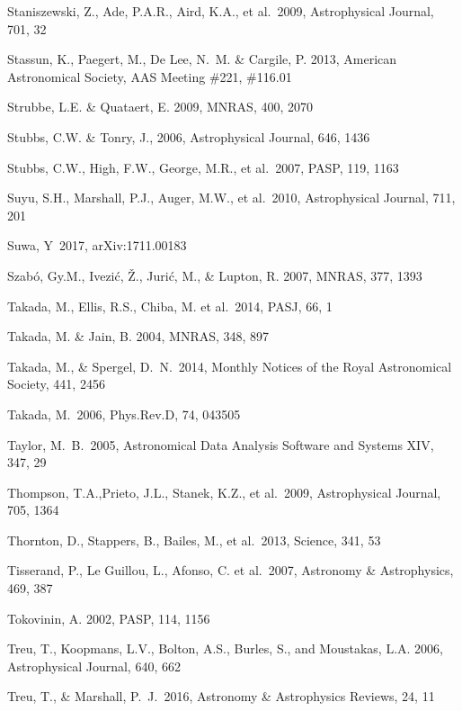 \documentclass[twocolumn]{aastex61}
\begin{document}
\begin{thebibliography}{}

\bibitem[()]{} Staniszewski, Z., Ade, P.A.R., Aird, K.A., et al.~2009,  Astrophysical  Journal, 701, 32

\bibitem[()]{} Stassun, K., Paegert, M., De Lee, N.~M. \& Cargile, P. 2013, American Astronomical Society,
                      AAS Meeting \#221, \#116.01

\bibitem[()]{} Strubbe, L.E. \& Quataert, E. 2009, MNRAS, 400, 2070

\bibitem[()]{} Stubbs, C.W. \& Tonry, J., 2006, Astrophysical Journal, 646, 1436

\bibitem[()]{} Stubbs, C.W., High, F.W., George, M.R., et al.~2007, PASP, 119, 1163

\bibitem[()]{} Suyu, S.H., Marshall, P.J., Auger, M.W., et al.~2010, Astrophysical Journal, 711, 201

\bibitem[()]{} Suwa, Y~2017, arXiv:1711.00183

\bibitem[()]{} Szab\'o, Gy.M., Ivezi\'c, \v{Z}., Juri\'c, M., \& Lupton, R. 2007, MNRAS, 377, 1393

\bibitem[()]{} Takada, M., Ellis, R.S., Chiba, M. et al.~2014, PASJ,
  66, 1

\bibitem[()]{} Takada, M. \& Jain, B. 2004, MNRAS, 348, 897

\bibitem[()]{} Takada, M., \& Spergel, D.~N.~2014, Monthly Notices of the Royal Astronomical Society, 441, 2456

\bibitem[()]{} Takada, M.\ 2006, Phys.Rev.D, 74, 043505

 Taylor, M.~B.\ 2005, Astronomical Data Analysis Software and Systems XIV, 347, 29

\bibitem[()]{} Thompson, T.A.,Prieto, J.L., Stanek, K.Z., et al.~2009, Astrophysical Journal, 705, 1364

\bibitem[()]{} Thornton, D., Stappers, B., Bailes, M., et al.~2013, Science, 341, 53

\bibitem[()]{} Tisserand, P., Le Guillou, L., Afonso, C. et al.~2007, Astronomy \& Astrophysics, 469, 387

\bibitem[()]{} Tokovinin, A. 2002, PASP, 114, 1156

\bibitem[()]{} Treu, T., Koopmans, L.V., Bolton, A.S., Burles, S., and
  Moustakas, L.A. 2006, Astrophysical Journal, 640, 662

\bibitem[()]{} Treu, T., \& Marshall, P.~J.\ 2016, Astronomy \& Astrophysics Reviews, 24, 11


\end{thebibliography}
\end{document}
